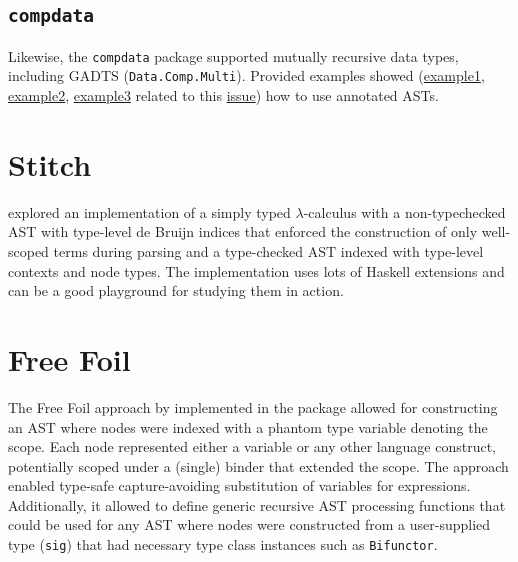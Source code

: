 \subsection{\texttt{compdata}}
\label{chap:LiteratureReview:sec:AstRepresentations:Compdata}

Likewise, the \texttt{compdata} package \cite{compdata-hackage} supported mutually recursive data types, including GADTS (\texttt{Data.Comp.Multi}).
Provided examples showed (\href{https://github.com/pa-ba/compdata/blob/e916a9ae847b37d7932669f9365de987d09fd9e0/src/Data/Comp/Multi.hs#L322
}{example1}, \href{https://github.com/pa-ba/compdata/blob/e916a9ae847b37d7932669f9365de987d09fd9e0/examples/Examples/Multi/Desugar.hs}{example2}, \href{https://gist.github.com/liarokapisv/bb857a23ecd9df945690f73e0acfbe80}{example3} related to this \href{https://github.com/pa-ba/compdata/issues/35}{issue}) how to use annotated ASTs.

\section{Stitch}

\citeauthor{eisenberg-stitch-2020} explored an implementation of a simply typed $\lambda$-calculus with a non-typechecked AST with type-level de Bruijn indices that enforced the construction of only well-scoped terms during parsing and a type-checked AST indexed with type-level contexts and node types. The implementation uses lots of Haskell extensions and can be a good playground for studying them in action.

\section{Free Foil}
\label{chap:LiteratureReview:sec:AstRepresentations:FreeFoil}

The Free Foil \cite{kudasov-free-2024} approach by \citeauthor{kudasov-free-2024} implemented in the \cite{free-foil-hackage} package allowed for constructing an AST where nodes were indexed with a phantom type variable denoting the scope. Each node represented either a variable or any other language construct, potentially scoped under a (single) binder that extended the scope. The approach enabled type-safe capture-avoiding substitution of variables for expressions. Additionally, it allowed to define generic recursive AST processing functions that could be used for any AST where nodes were constructed from a user-supplied type (\texttt{sig}) that had necessary type class instances such as \texttt{Bifunctor}.


